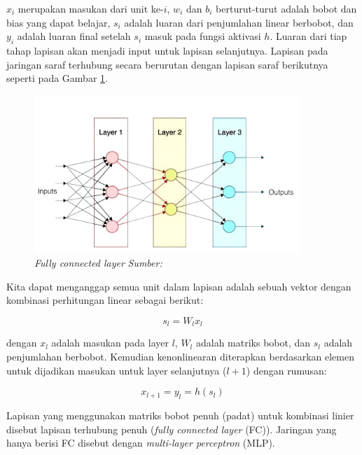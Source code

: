 $x_i$ merupakan masukan dari unit ke-$i$, $w_i$ dan $b_i$ berturut-turut adalah bobot dan bias yang dapat belajar, $s_i$ adalah luaran dari penjumlahan linear berbobot, dan $y_i$ adalah luaran final setelah $s_i$ masuk pada fungsi aktivasi $h$. Luaran dari tiap tahap lapisan akan menjadi input untuk lapisan selanjutnya. Lapisan pada jaringan saraf terhubung secara berurutan dengan lapisan saraf berikutnya seperti pada Gambar \ref{fully_connected}. 

\begin{figure}[h]
    \centering
    \includegraphics[width=10cm]{gambar/fully_connected.png}
    \caption{\emph{Fully connected layer} \emph{Sumber: \cite{szeliski_2011}}}
    \label{fully_connected}
\end{figure}

Kita dapat menganggap semua unit dalam lapisan adalah sebuah vektor dengan kombinasi perhitungan linear sebagai berikut:

\begin{equation}
    s_l = W_lx_l
\end{equation}

dengan $x_l$ adalah masukan pada layer $l$, $W_l$ adalah matriks bobot, dan $s_l$ adalah penjumlahan berbobot. Kemudian kenonlinearan diterapkan berdasarkan elemen untuk dijadikan masukan untuk layer selanjutnya ($l+1$) dengan rumusan:

\begin{equation}
    x_{l+1} = y_l = h(s_l)
\end{equation}

Lapisan yang menggunakan matriks bobot penuh (padat) untuk kombinasi linier disebut lapisan terhubung penuh (\emph{fully connected layer} (FC)). Jaringan yang hanya berisi FC disebut dengan \emph{multi-layer perceptron} (MLP).


